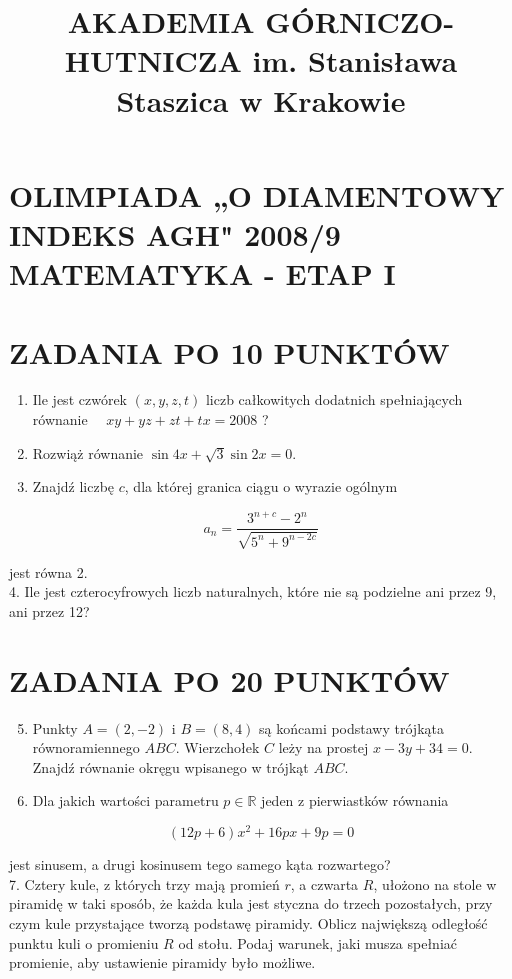 \documentclass[10pt]{article}
\title{AKADEMIA GÓRNICZO-HUTNICZA im. Stanisława Staszica w Krakowie }
\author{}
\date{}
\begin{document}
\maketitle
\section*{OLIMPIADA „O DIAMENTOWY INDEKS AGH" 2008/9 MATEMATYKA - ETAP I}
\section*{ZADANIA PO 10 PUNKTÓW}
\begin{enumerate}
  \item Ile jest czwórek $(x, y, z, t)$ liczb całkowitych dodatnich spełniających równanie $\quad x y+y z+z t+t x=2008$ ?
  \item Rozwiąż równanie $\sin 4 x+\sqrt{3} \sin 2 x=0$.
  \item Znajdź liczbę $c$, dla której granica ciągu o wyrazie ogólnym
\end{enumerate}

$$
a_{n}=\frac{3^{n+c}-2^{n}}{\sqrt{5^{n}+9^{n-2 c}}}
$$

jest równa 2.\\
4. Ile jest czterocyfrowych liczb naturalnych, które nie są podzielne ani przez 9, ani przez 12?

\section*{ZADANIA PO 20 PUNKTÓW}
\begin{enumerate}
  \setcounter{enumi}{4}
  \item Punkty $A=(2,-2)$ i $B=(8,4)$ są końcami podstawy trójkąta równoramiennego $A B C$. Wierzchołek $C$ leży na prostej $x-3 y+34=0$. Znajdź równanie okręgu wpisanego w trójkąt $A B C$.
  \item Dla jakich wartości parametru $p \in \mathbb{R}$ jeden z pierwiastków równania
\end{enumerate}

$$
(12 p+6) x^{2}+16 p x+9 p=0
$$

jest sinusem, a drugi kosinusem tego samego kąta rozwartego?\\
7. Cztery kule, z których trzy mają promień $r$, a czwarta $R$, ułożono na stole w piramidę w taki sposób, że każda kula jest styczna do trzech pozostałych, przy czym kule przystające tworzą podstawę piramidy. Oblicz największą odległość punktu kuli o promieniu $R$ od stołu. Podaj warunek, jaki musza spełniać promienie, aby ustawienie piramidy było możliwe.
\end{document}
